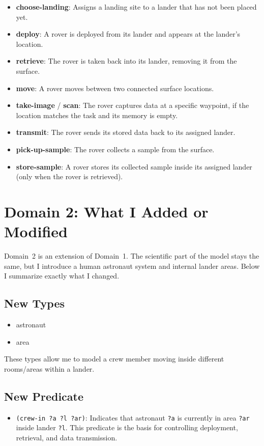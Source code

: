 \documentclass[11pt,a4paper]{article}
\newcommand{\pred}[1]{\texttt{(#1)}}
\newcommand{\action}[1]{\textbf{\textsf{#1}}}
\begin{document}
\begin{itemize}
  \item \action{choose-landing}: Assigns a landing site to a lander that has not been placed yet.
  \item \action{deploy}: A rover is deployed from its lander and appears at the lander’s location.
  \item \action{retrieve}: The rover is taken back into its lander, removing it from the surface.
  \item \action{move}: A rover moves between two connected surface locations.
  \item \action{take-image} / \action{scan}: The rover captures data at a specific waypoint, if the location matches the task and its memory is empty.
  \item \action{transmit}: The rover sends its stored data back to its assigned lander.
  \item \action{pick-up-sample}: The rover collects a sample from the surface.
  \item \action{store-sample}: A rover stores its collected sample inside its assigned lander (only when the rover is retrieved).
\end{itemize}

\section{Domain 2: What I Added or Modified}

Domain~2 is an extension of Domain~1. The scientific part of the model stays the same, but I introduce a human astronaut system and internal lander areas. Below I summarize exactly what I changed.

\subsection*{New Types}
\begin{itemize}
  \item \textsf{astronaut}
  \item \textsf{area}
\end{itemize}
These types allow me to model a crew member moving inside different rooms/areas within a lander.

\subsection*{New Predicate}
\begin{itemize}
  \item \pred{crew-in ?a ?l ?ar}: Indicates that astronaut \texttt{?a} is currently in area \texttt{?ar} inside lander \texttt{?l}. This predicate is the basis for controlling deployment, retrieval, and data transmission.
\end{itemize}
\end{document}
